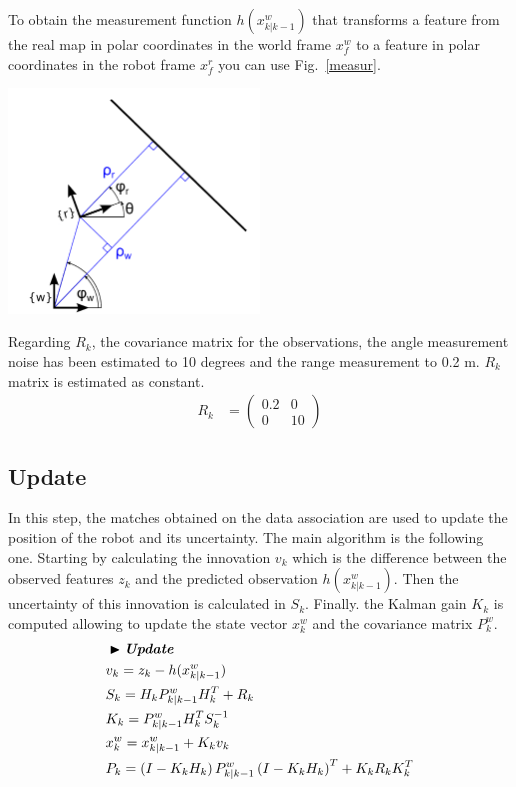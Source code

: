 \documentclass[a4paper,10pt]{article}
\begin{document}
To obtain the measurement function $h(x_{k|k-1}^w)$ that transforms a feature from the real map in polar coordinates in the world frame $x_f^w$ to a feature in polar coordinates in the robot frame $x_f^r$ you can use  Fig.~\ref{measur}.
\begin{center}
	\includegraphics[width=0.50\textwidth]{pict/find_h.png}
	\label{measur}
\end{center}

Regarding $R_k$, the covariance matrix for the observations, the angle measurement noise has been estimated to 10 degrees and the range measurement to 0.2 m. $R_k$ matrix is estimated as constant.
\begin{align}
    \label{R_k}
    R_k &= \begin{pmatrix}
        0.2 & 0 \\
        0 & 10
    \end{pmatrix}
\end{align}

\subsection{Update}

In this step, the matches obtained on the data association are used to update the position of the robot and its uncertainty. The main algorithm is the following one. Starting by calculating the innovation $v_k$ which is the difference between the observed features $z_k$ and the predicted observation $h(x_{k|k-1}^w)$. Then the uncertainty of this innovation is calculated in $S_k$. Finally. the Kalman gain $K_k$ is computed allowing to update the state vector $x_k^w$ and the covariance matrix $P_k^w$.
\begin{align*}
    & \blacktriangleright \textit{\textbf{Update}}\\
    & v_k = z_k - h(x_{k|k-1}^w) \\
    & S_k = H_k P_{k|k-1}^w H_k^T + R_k \\
    & K_k = P_{k|k-1}^w  H_k^T S_k^{-1} \\
    & x_k^w = x_{k|k-1}^w + K_k v_k \\      
    & P_k = \left( I - K_k H_{k} \right) P_{k|k-1}^w \left( I - K_k H_{k} \right)^T + K_k R_k K_k^T
\end{align*}
\end{document}
